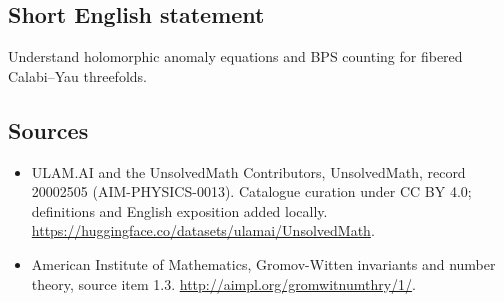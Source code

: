 \documentclass[11pt]{article}
\begin{document}
\subsection{Short English statement}
Understand holomorphic anomaly equations and BPS counting for fibered Calabi–Yau threefolds.
\subsection{Sources}
\begin{itemize}
\item[\hypertarget{source:20002505:1}{S1}] ULAM.AI and the UnsolvedMath Contributors, UnsolvedMath, record 20002505 (AIM-PHYSICS-0013). Catalogue curation under CC BY 4.0; definitions and English exposition added locally.
\url{https://huggingface.co/datasets/ulamai/UnsolvedMath}.
\item[\hypertarget{source:20002505:2}{S2}] American Institute of Mathematics, Gromov-Witten invariants and number theory, source item 1.3.
\url{http://aimpl.org/gromwitnumthry/1/}.
\end{itemize}
\label{end:20002505}
\end{document}
